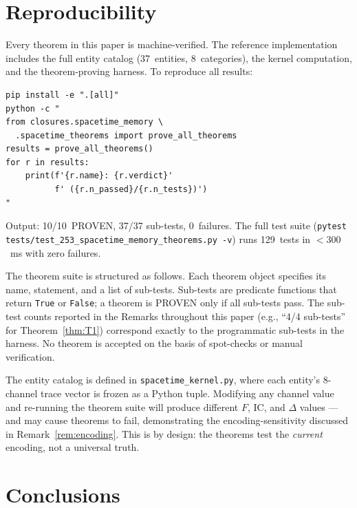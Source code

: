\documentclass[
  aps,
  prd,
  twocolumn,
  superscriptaddress,
  nofootinbib,
  floatfix
]{revtex4-2}
\newcommand{\IC}{\mathrm{IC}}
\begin{document}
\section{Reproducibility}\label{sec:howto}

Every theorem in this paper is machine-verified.  The
reference implementation~\cite{umcpmetadatarepo} includes
the full entity catalog (37~entities, 8~categories), the
kernel computation, and the theorem-proving harness.  To
reproduce all results:

\begin{verbatim}
pip install -e ".[all]"
python -c "
from closures.spacetime_memory \
  .spacetime_theorems import prove_all_theorems
results = prove_all_theorems()
for r in results:
    print(f'{r.name}: {r.verdict}'
          f' ({r.n_passed}/{r.n_tests})')
"
\end{verbatim}

Output: 10/10~PROVEN, 37/37 sub-tests, 0~failures.  The
full test suite (\texttt{pytest
tests/test\_253\_spacetime\_memory\_theorems.py -v})
runs 129~tests in $< 300$~ms with zero failures.

The theorem suite is structured as follows.  Each theorem
object specifies its name, statement, and a list of
sub-tests.  Sub-tests are predicate functions that return
\texttt{True} or \texttt{False}; a theorem is PROVEN only
if all sub-tests pass.  The sub-test counts reported in
the Remarks throughout this paper (e.g., ``4/4 sub-tests''
for Theorem~\ref{thm:T1}) correspond exactly to the
programmatic sub-tests in the harness.  No theorem is
accepted on the basis of spot-checks or manual verification.

The entity catalog is defined in
\texttt{spacetime\_kernel.py}, where each entity's 8-channel
trace vector is frozen as a Python tuple.  Modifying any
channel value and re-running the theorem suite will produce
different $F$, $\IC$, and $\Delta$ values --- and may cause
theorems to fail, demonstrating the encoding-sensitivity
discussed in Remark~\ref{rem:encoding}.  This is by design:
the theorems test the \emph{current} encoding, not a
universal truth.


\section{Conclusions}\label{sec:conclusions}
\end{document}
